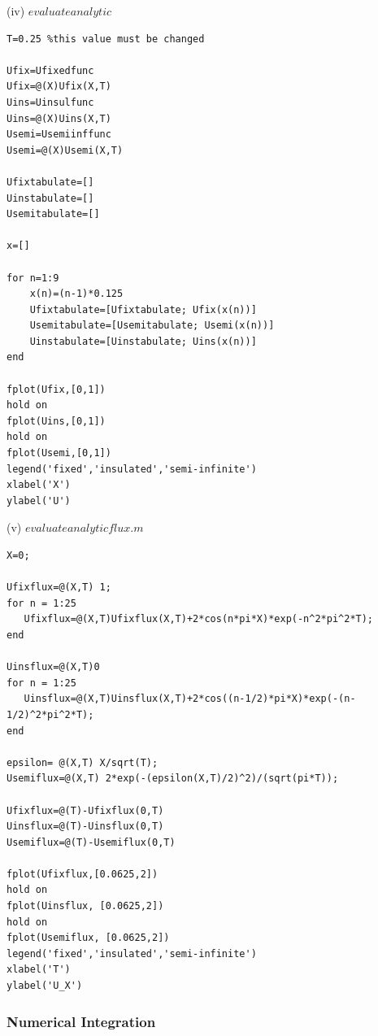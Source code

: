 \documentclass[10pt,a4paper]{report}
\begin{document}
(iv) $evaluateanalytic$
\begin{verbatim}
T=0.25 %this value must be changed

Ufix=Ufixedfunc
Ufix=@(X)Ufix(X,T)
Uins=Uinsulfunc
Uins=@(X)Uins(X,T)
Usemi=Usemiinffunc
Usemi=@(X)Usemi(X,T)

Ufixtabulate=[]
Uinstabulate=[]
Usemitabulate=[]

x=[]

for n=1:9
    x(n)=(n-1)*0.125
    Ufixtabulate=[Ufixtabulate; Ufix(x(n))]
    Usemitabulate=[Usemitabulate; Usemi(x(n))]
    Uinstabulate=[Uinstabulate; Uins(x(n))] 
end

fplot(Ufix,[0,1])
hold on
fplot(Uins,[0,1])
hold on
fplot(Usemi,[0,1])
legend('fixed','insulated','semi-infinite')
xlabel('X')
ylabel('U')
\end{verbatim}
\vspace{0.5cm}

(v) $evaluateanalyticflux.m$
\begin{verbatim}
X=0;
 
Ufixflux=@(X,T) 1;
for n = 1:25
   Ufixflux=@(X,T)Ufixflux(X,T)+2*cos(n*pi*X)*exp(-n^2*pi^2*T);
end
      
Uinsflux=@(X,T)0
for n = 1:25
   Uinsflux=@(X,T)Uinsflux(X,T)+2*cos((n-1/2)*pi*X)*exp(-(n-1/2)^2*pi^2*T);    
end
    
epsilon= @(X,T) X/sqrt(T);
Usemiflux=@(X,T) 2*exp(-(epsilon(X,T)/2)^2)/(sqrt(pi*T));
    
Ufixflux=@(T)-Ufixflux(0,T)
Uinsflux=@(T)-Uinsflux(0,T)
Usemiflux=@(T)-Usemiflux(0,T)

fplot(Ufixflux,[0.0625,2])
hold on
fplot(Uinsflux, [0.0625,2])
hold on
fplot(Usemiflux, [0.0625,2])
legend('fixed','insulated','semi-infinite')
xlabel('T')
ylabel('U_X')
\end{verbatim}
\vspace{1cm}

\newpage

\subsubsection*{Numerical Integration}
\vspace{0.5cm}
\end{document}
